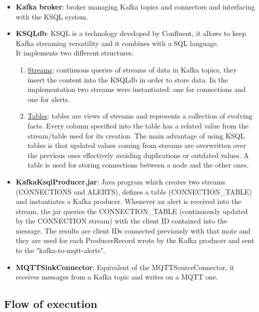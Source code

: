 \documentclass[table, 12pt]{article}
\begin{document}
\begin{itemize}
    \item \textbf{Kafka broker}: broker managing Kafka topics and connectors and interfacing with the KSQL system.
    \item \textbf{KSQLdb}: KSQL is a technology developed by Confluent, it allows to keep Kafka streaming versatility and it combines with a SQL language. \\It implements two different structures:
          \begin{enumerate}
              \item \underline{Streams}: continuous queries of streams of data in Kafka topics, they insert the content into the KSQLdb in order to store data. In the implementation two streams were instantiated: one for connections and one for alerts.
              \item \underline{Tables}: tables are views of streams and represents a collection of evolving facts. Every column specified into the table has a related value from the stream/table used for its creation. The main advantage of using KSQL tables is that updated values coming from streams are overwritten over the previous ones effectively avoiding duplications or outdated values. A table is used for storing connections between a node and the other ones.
          \end{enumerate}
    \item \textbf{KafkaKsqlProducer.jar}: Java program which creates two streams (CONNECTIONS and ALERTS), defines a table (CONNECTION\_TABLE) and instantiates a Kafka producer. Whenever an alert is received into the stream, the jar queries the CONNECTION\_TABLE (continuously updated by the CONNECTION stream) with the client ID contained into the message. The results are client IDs connected previously with that mote and they are used for each ProducerRecord wrote by the Kafka producer and sent to the "kafka-to-mqtt-alerts".
    \item \textbf{MQTTSinkConnector}: Equivalent of the MQTTSourceConnector, it receives messages from a Kafka topic and writes on a MQTT one.

\end{itemize}


\subsection{Flow of execution}
\end{document}
